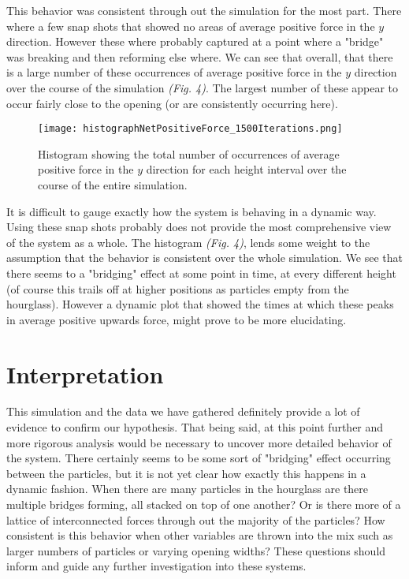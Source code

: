 \documentclass{article}%
\newcommand{\tab} {\hspace{5mm}}
\begin{document}
	This behavior was consistent through out the simulation for the most part. There where a few snap shots that showed no areas of average positive force in the $y$ direction. However these where probably captured at a point where a "bridge" was breaking and then reforming else where. We can see that overall, that there is a large number of these occurrences of average positive force in the $y$ direction over the course of the simulation \textit{(Fig. 4)}. The largest number of these appear to occur fairly close to the opening (or are consistently occurring here).
	
\begin{figure}[h]
	\centering
		\texttt{[image: histographNetPositiveForce\_1500Iterations.png]}
	\label{fig:fig01} 
	\caption{Histogram showing the total number of occurrences of average positive force in the $y$ direction for each height interval over the course of the entire simulation.} 
	
\end{figure}

	It is difficult to gauge exactly how the system is behaving in a dynamic way. Using these snap shots probably does not provide the most comprehensive view of the system as a whole. The histogram \textit{(Fig. 4)}, lends some weight to the assumption that the behavior is consistent over the whole simulation. We see that there seems to a "bridging" effect at some point in time, at every different height (of course this trails off at higher positions as particles empty from the hourglass). However a dynamic plot that showed the times at which these peaks in average positive upwards force, might prove to be more elucidating.

\section{Interpretation}

\tab This simulation and the data we have gathered definitely provide a lot of evidence to confirm our hypothesis. That being said, at this point further and more rigorous analysis would be necessary to uncover more detailed behavior of the system. There certainly seems to be some sort of "bridging" effect occurring between the particles, but it is not yet clear how exactly this happens in a dynamic fashion. When there are many particles in the hourglass are there multiple bridges forming, all stacked on top of one another? Or is there more of a lattice of interconnected forces through out the majority of the particles? How consistent is this behavior when other variables are thrown into the mix such as larger numbers of particles or varying opening widths? These questions should inform and guide any further investigation into these systems.
	
\end{document}
